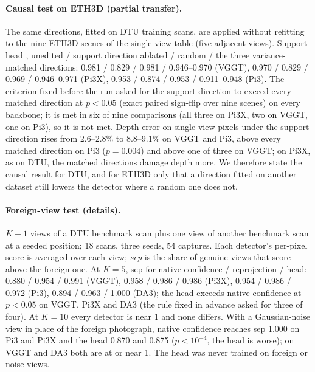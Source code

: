 \paragraph{Causal test on ETH3D (partial transfer).}
The same directions, fitted on DTU training scans, are applied without refitting to the nine ETH3D scenes of the single-view table (five adjacent views). Support-head \auroc{}, unedited / support direction ablated / random / the three variance-matched directions: 0.981 / 0.829 / 0.981 / 0.946--0.970 (VGGT), 0.970 / 0.829 / 0.969 / 0.946--0.971 (Pi3X), 0.953 / 0.874 / 0.953 / 0.911--0.948 (Pi3). The criterion fixed before the run asked for the support direction to exceed every matched direction at $p<0.05$ (exact paired sign-flip over nine scenes) on every backbone; it is met in six of nine comparisons (all three on Pi3X, two on VGGT, one on Pi3), so it is not met. Depth error on single-view pixels under the support direction rises from 2.6--2.8\% to 8.8--9.1\% on VGGT and Pi3, above every matched direction on Pi3 ($p=0.004$) and above one of three on VGGT; on Pi3X, as on DTU, the matched directions damage depth more. We therefore state the causal result for DTU, and for ETH3D only that a direction fitted on another dataset still lowers the detector where a random one does not.

\paragraph{Foreign-view test (details).}
$K-1$ views of a DTU benchmark scan plus one view of another benchmark scan at a seeded position; 18 scans, three seeds, 54 captures. Each detector's per-pixel score is averaged over each view; \emph{sep} is the share of genuine views that score above the foreign one. At $K=5$, sep for native confidence / reprojection / head: 0.880 / 0.954 / 0.991 (VGGT), 0.958 / 0.986 / 0.986 (Pi3X), 0.954 / 0.986 / 0.972 (Pi3), 0.894 / 0.963 / 1.000 (DA3); the head exceeds native confidence at $p<0.05$ on VGGT, Pi3X and DA3 (the rule fixed in advance asked for three of four). At $K=10$ every detector is near 1 and none differs. With a Gaussian-noise view in place of the foreign photograph, native confidence reaches sep 1.000 on Pi3 and Pi3X and the head 0.870 and 0.875 ($p<10^{-4}$, the head is worse); on VGGT and DA3 both are at or near 1. The head was never trained on foreign or noise views.

